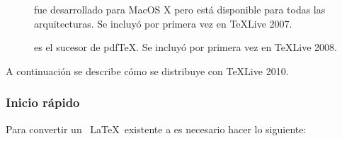 \begin{description}
\item[] fue desarrollado para MacOS X pero está disponible para 
   todas las arquitecturas. Se incluyó por primera vez en \TeX{}Live 2007.
\item[] es el sucesor de pdf\TeX. Se incluyó por primera vez en
   \TeX{}Live 2008. 
\end{description}

A continuación se describe cómo se distribuye  con \TeX{}Live 
2010.

\subsubsection{Inicio rápido}

Para convertir un \filenomo\ \LaTeX\ existente a  es necesario
hacer lo siguiente:

